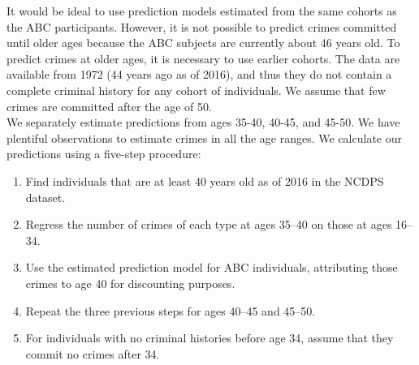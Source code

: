 \noindent It would be ideal to use prediction models estimated from the same cohorts as the ABC participants. However, it is not possible to predict crimes committed until older ages because the ABC subjects are currently about 46 years old. To predict crimes at older ages, it is necessary to use earlier cohorts. The data are available from 1972 (44 years ago as of 2016), and thus they do not contain a complete criminal history for any cohort of individuals. 
We assume that few crimes are committed after the age of 50. \\
 We separately estimate predictions from ages 35-40, 40-45, and 45-50. We have plentiful observations to estimate crimes in all the age ranges. %
We calculate our predictions using a five-step procedure: \\
\begin{enumerate}
\item Find individuals that are at least 40 years old as of 2016 in the NCDPS dataset.
\item Regress the number of crimes of each type at ages 35--40 on those at ages 16--34.
\item Use the estimated prediction model for ABC individuals, attributing those crimes to age 40 for discounting purposes.
\item Repeat the three previous steps for ages 40--45 and 45--50. %
\item For individuals with no criminal histories before age 34, assume that they commit no crimes after 34.
\end{enumerate}

